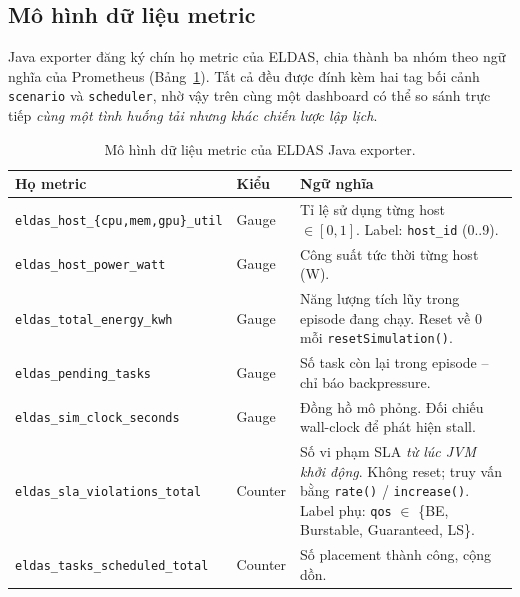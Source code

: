 \subsection{Mô hình dữ liệu metric}
Java exporter đăng ký chín họ metric của ELDAS, chia thành ba nhóm
theo ngữ nghĩa của Prometheus (Bảng~\ref{tab:metric-model}). Tất cả
đều được đính kèm hai tag bối cảnh \texttt{scenario} và
\texttt{scheduler}, nhờ vậy trên cùng một dashboard có thể so sánh
trực tiếp \emph{cùng một tình huống tải nhưng khác chiến lược lập
lịch}.

\begin{table}[H]
  \centering
  \caption{Mô hình dữ liệu metric của ELDAS Java exporter.}
  \label{tab:metric-model}
  \footnotesize
  \begin{tabularx}{\linewidth}{l l X}
    \toprule
    \textbf{Họ metric} & \textbf{Kiểu} & \textbf{Ngữ nghĩa} \\
    \midrule
    \texttt{eldas\_host\_\{cpu,mem,gpu\}\_util}
        & Gauge & Tỉ lệ sử dụng từng host $\in[0,1]$.
                 Label: \texttt{host\_id} (0..9). \\
    \texttt{eldas\_host\_power\_watt}
        & Gauge & Công suất tức thời từng host (W). \\
    \texttt{eldas\_total\_energy\_kwh}
        & Gauge & Năng lượng tích lũy trong episode đang chạy. Reset về
                 $0$ mỗi \texttt{resetSimulation()}. \\
    \texttt{eldas\_pending\_tasks}
        & Gauge & Số task còn lại trong episode -- chỉ báo
                 backpressure. \\
    \texttt{eldas\_sim\_clock\_seconds}
        & Gauge & Đồng hồ mô phỏng. Đối chiếu wall-clock để phát hiện
                 stall. \\
    \texttt{eldas\_sla\_violations\_total}
        & Counter & Số vi phạm SLA \emph{từ lúc JVM khởi động}.
                   Không reset; truy vấn bằng \texttt{rate()} /
                   \texttt{increase()}. Label phụ:
                   \texttt{qos} $\in$ \{BE, Burstable, Guaranteed, LS\}. \\
    \texttt{eldas\_tasks\_scheduled\_total}
        & Counter & Số placement thành công, cộng dồn. \\
    \bottomrule
  \end{tabularx}
\end{table}

